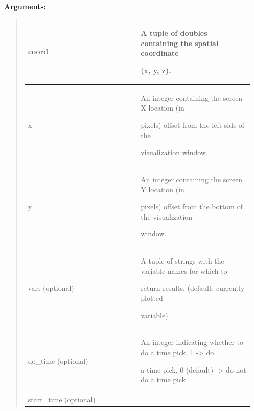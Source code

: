 \documentclass[letterpaper,10pt,english]{sphinxmanual}
\begin{document}
\begin{DUlineblock}{0em}
\item[] 
\item[] \textbf{Arguments:}
\end{DUlineblock}
\begin{quote}

\begin{tabular}{|p{0.475\linewidth}|p{0.475\linewidth}|}
\hline

coord
 & 
\begin{DUlineblock}{0em}
\item[] A tuple of doubles containing the spatial coordinate
\item[] (x, y, z).
\end{DUlineblock}
\\
\hline
x
 & 
\begin{DUlineblock}{0em}
\item[] An integer containing the screen X location (in
\item[] pixels) offset from the left side of the
\item[] visualization window.
\end{DUlineblock}
\\
\hline
y
 & 
\begin{DUlineblock}{0em}
\item[] An integer containing the screen Y location (in
\item[] pixels) offset from the bottom of the visualization
\item[] window.
\end{DUlineblock}
\\
\hline
vars (optional)
 & 
\begin{DUlineblock}{0em}
\item[] A tuple of strings with the variable names for which to
\item[] return results. (default: currently plotted
\item[] variable)
\end{DUlineblock}
\\
\hline
do\_time (optional)
 & 
\begin{DUlineblock}{0em}
\item[] An integer indicating whether to do a time pick. 1 -\textgreater{} do
\item[] a time pick, 0 (default) -\textgreater{} do not do a time pick.
\end{DUlineblock}
\\
\hline
start\_time (optional)
 & 
\begin{DUlineblock}{0em}

\end{DUlineblock}
\end{tabular}
\end{quote}
\end{document}
